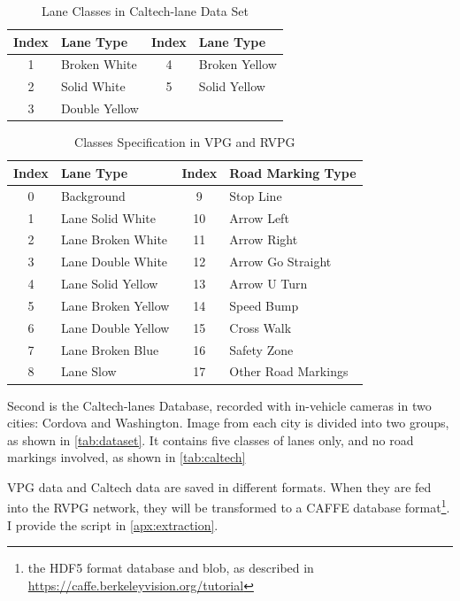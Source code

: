\begin{spacing}{1.5}
\begin{table}[!ht]
\centering
\caption{Lane Classes in Caltech-lane Data Set}
\label{tab:caltech}
\begin{tabular}{@{}clcl@{}}
\toprule
Index & Lane Type & Index & Lane Type \\ \midrule
1 & Broken White & 4 & Broken Yellow \\
2 & Solid White & 5 & Solid Yellow \\
3 & Double Yellow & \multicolumn{1}{l}{} &  \\ \bottomrule
\end{tabular}
\end{table}


\begin{table}[ht]
\centering
\caption{Classes Specification in VPG and RVPG}
\label{tab:classes}
\begin{tabular}{clcl}
\toprule
Index & Lane Type          & Index & Road Marking Type   \\ \midrule
0     & Background         & 9     & Stop Line           \\
1     & Lane Solid White   & 10    & Arrow Left          \\
2     & Lane Broken White  & 11    & Arrow Right         \\
3     & Lane Double White  & 12    & Arrow Go Straight   \\
4     & Lane Solid Yellow  & 13    & Arrow U Turn        \\
5     & Lane Broken Yellow & 14    & Speed Bump          \\
6     & Lane Double Yellow & 15    & Cross Walk          \\
7     & Lane Broken Blue   & 16    & Safety Zone         \\
8     & Lane Slow          & 17    & Other Road Markings \\ \bottomrule
\end{tabular}
\end{table}%


Second is the Caltech-lanes Database, recorded with in-vehicle cameras in two cities: Cordova and Washington. Image from each city is divided into two groups, as shown in \autoref{tab:dataset}. It contains five classes of lanes only, and no road markings involved, as shown in \autoref{tab:caltech}

VPG data and Caltech data are saved in different formats. When they are fed into the RVPG network, they will be transformed to a CAFFE database format\footnote{the HDF5 format database and blob, as described in \url{https://caffe.berkeleyvision.org/tutorial}}. I provide the script in \autoref{apx:extraction}.


\end{spacing}
